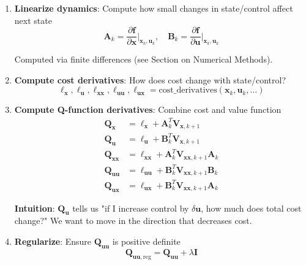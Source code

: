 \documentclass[11pt,a4paper]{article}
\begin{document}
\begin{enumerate}
    \item \textbf{Linearize dynamics}: Compute how small changes in state/control affect next state
    \begin{equation}
    \mathbf{A}_k = \frac{\partial \mathbf{f}}{\partial \mathbf{x}}\Big|_{\mathbf{x}_k, \mathbf{u}_k}, \quad \mathbf{B}_k = \frac{\partial \mathbf{f}}{\partial \mathbf{u}}\Big|_{\mathbf{x}_k, \mathbf{u}_k}
    \end{equation}
    
    Computed via finite differences (see Section on Numerical Methods).
    
    \item \textbf{Compute cost derivatives}: How does cost change with state/control?
    \begin{equation}
    \ell_{\mathbf{x}}, \ell_{\mathbf{u}}, \ell_{\mathbf{xx}}, \ell_{\mathbf{uu}}, \ell_{\mathbf{ux}} = \text{cost\_derivatives}(\mathbf{x}_k, \mathbf{u}_k, \ldots)
    \end{equation}
    
    \item \textbf{Compute Q-function derivatives}: Combine cost and value function
    \begin{align}
    \mathbf{Q}_{\mathbf{x}} &= \ell_{\mathbf{x}} + \mathbf{A}_k^T \mathbf{V}_{\mathbf{x},k+1} \\
    \mathbf{Q}_{\mathbf{u}} &= \ell_{\mathbf{u}} + \mathbf{B}_k^T \mathbf{V}_{\mathbf{x},k+1} \\
    \mathbf{Q}_{\mathbf{xx}} &= \ell_{\mathbf{xx}} + \mathbf{A}_k^T \mathbf{V}_{\mathbf{xx},k+1} \mathbf{A}_k \\
    \mathbf{Q}_{\mathbf{uu}} &= \ell_{\mathbf{uu}} + \mathbf{B}_k^T \mathbf{V}_{\mathbf{xx},k+1} \mathbf{B}_k \\
    \mathbf{Q}_{\mathbf{ux}} &= \ell_{\mathbf{ux}} + \mathbf{B}_k^T \mathbf{V}_{\mathbf{xx},k+1} \mathbf{A}_k
    \end{align}
    
    \textbf{Intuition}: $\mathbf{Q}_{\mathbf{u}}$ tells us "if I increase control by $\delta \mathbf{u}$, how much does total cost change?" We want to move in the direction that decreases cost.
    
    \item \textbf{Regularize}: Ensure $\mathbf{Q}_{\mathbf{uu}}$ is positive definite
    \begin{equation}
    \mathbf{Q}_{\mathbf{uu},\text{reg}} = \mathbf{Q}_{\mathbf{uu}} + \lambda \mathbf{I}
    \end{equation}
    

\end{enumerate}
\end{document}
